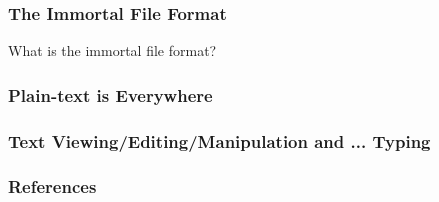 \documentclass{beamer}
\begin{document}
\begin{frame}
\frametitle{The Immortal File Format}

  \begin{block}{What is the immortal file format?}
  
  \end{block}

\end{frame}

\begin{frame}
\frametitle{Plain-text is Everywhere}


\end{frame}

\begin{frame}
\frametitle{Text Viewing/Editing/Manipulation and ... Typing}



\end{frame}



\begin{frame}
  \frametitle{References}
  \tiny{
    \begin{thebibliography}{99}


  \end{thebibliography}
}
\end{frame}

\end{document}
